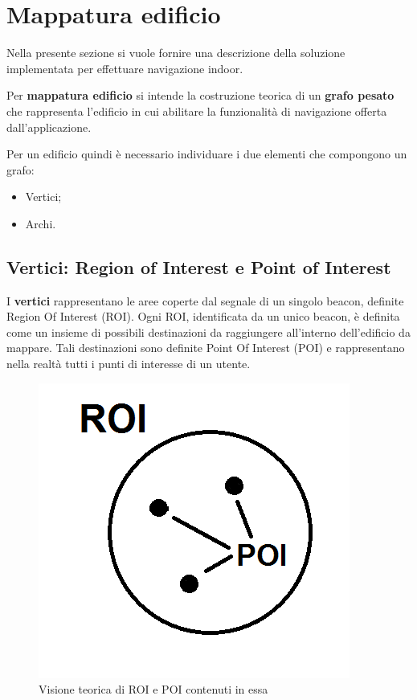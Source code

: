 \documentclass[../ManualeSviluppatore.tex]{subfiles}
\begin{document}
\section{Mappatura edificio}
	Nella presente sezione si vuole fornire una descrizione della soluzione implementata per effettuare \gls{navigazione indoor}.
	
	Per \textbf{mappatura edificio} si intende la costruzione teorica di un \textbf{grafo pesato} che rappresenta l'edificio in cui abilitare la funzionalità di navigazione offerta dall'applicazione.
	
	Per un edificio quindi è necessario individuare i due elementi che compongono un grafo:
	\begin{itemize}
		\item Vertici;
		\item Archi.
	\end{itemize}
	
	\subsection{Vertici: Region of Interest e Point of Interest}
	
	I \textbf{vertici} rappresentano le aree coperte dal segnale di un singolo \gls{beacon}, definite Region Of Interest (\gls{ROI}).
	Ogni ROI, identificata da un unico \gls{beacon}, è definita come un insieme di possibili destinazioni da raggiungere all'interno dell'edificio da mappare. Tali destinazioni sono definite Point Of Interest (\gls{POI}) e rappresentano nella realtà tutti i punti di interesse di un utente.
	
	\begin{figure} [h]
		\centering
		\includegraphics[scale=0.4]{img/ROIePOI}
		\caption{Visione teorica di ROI e POI contenuti in essa}
		\label{fig:ROIePOI}
	\end{figure}
	
\end{document}
